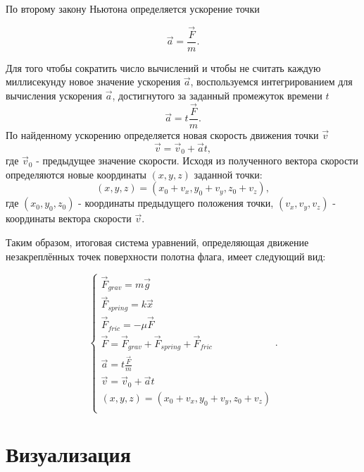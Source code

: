 По второму закону Ньютона определяется ускорение точки

\begin{equation}
\displaystyle \vec{a} = \frac{\vec{F}}{m}.
\label{eq:accel}
\end{equation}

\vspace{0.3cm}Для того чтобы сократить число вычислений и чтобы не считать каждую миллисекунду новое значение ускорения $\vec{a}$, воспользуемся интегрированием для вычисления ускорения $\vec{a}$, достигнутого за заданный промежуток времени $t$
\begin{equation}
\displaystyle \vec{a} = t\frac{\vec{F}}{m}.
\end{equation}
По найденному ускорению определяется новая скорость движения точки $\vec{v}$
\begin{equation}
\vec{v} = \vec{v}_{0} + \vec{a}t,
\end{equation}
где $\vec{v}_{0}$ - предыдущее значение скорости.
Исходя из полученного вектора скорости определяются новые координаты $(x, y, z)$ заданной точки:
\begin{equation}
(x, y, z) = (x_{0} + v_{x}, y_{0} + v_{y}, z_{0} + v_{z}) ,
\end{equation}
где $(x_{0}, y_{0}, z_{0})$ - координаты предыдущего положения точки,
$(v_{x}, v_{y}, v_{z})$ - координаты вектора скорости $\vec{v}$.

\vspace{0.3cm}Таким образом, итоговая система уравнений, определяющая движение незакреплённых точек поверхности полотна флага, имеет следующий вид:

\begin{equation}
\begin{cases}
\vec{F}_{grav} = m\vec{g}\\
\vec{F}_{spring} = k\vec{x}\\
\vec{F}_{fric} = -\mu\vec{F}\\
\vec{F} = \vec{F}_{grav} + \vec{F}_{spring} + \vec{F}_{fric}\\
\displaystyle \vec{a} = t\frac{\vec{F}}{m}\\
\vec{v} = \vec{v}_{0} + \vec{a}t\\
(x, y, z) = (x_{0} + v_{x}, y_{0} + v_{y}, z_{0} + v_{z})\\
\end{cases}.
\label{eq:sys}
\end{equation}

\section{Визуализация}

